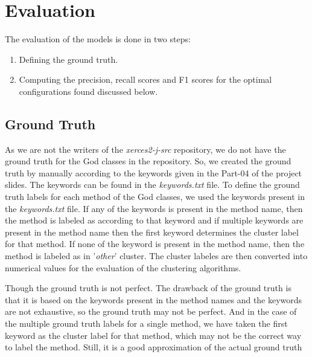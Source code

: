 \documentclass{article}
\newcommand\templateInstruction[1]{
\hl{#1}
}
\begin{document}


\section{Evaluation}
The evaluation of the models is done in two steps:
\begin{enumerate}
    \item Defining the ground truth.
    \item Computing the precision, recall scores and F1 scores for the optimal configurations found discussed below.
\end{enumerate}
\subsection{Ground Truth}
As we are not the writers of the \textit{xerces2-j-src} repository, we do not have the ground truth for the God classes in the repository. So, we created the ground truth by manually according to the keywords given in the Part-04 of the project slides. The keywords can be found in the \textit{keywords.txt} file.
To define the ground truth labels for each method of the God classes, we used the keywords present in the \textit{keywords.txt} file. If any of the keywords is present in the method name, then the method is labeled as according to that keyword and if multiple keywords are present in the method name then the first keyword determines the cluster label for that method. 
If none of the keyword is present in the method name, then the method is labeled as in '\textit{other}' cluster. 
The cluster labeles are then converted into numerical values for the evaluation of the clustering algorithms.

Though the ground truth is not perfect. The drawback of the ground truth is that it is based on the keywords present in the method names and the keywords are not exhaustive, so the ground truth may not be perfect.
And in the case of the multiple ground truth labels for a single method, we have taken the first keyword as the cluster label for that method, which may not be the correct way to label the method.
Still, it is a good approximation of the actual ground truth


\end{document}
